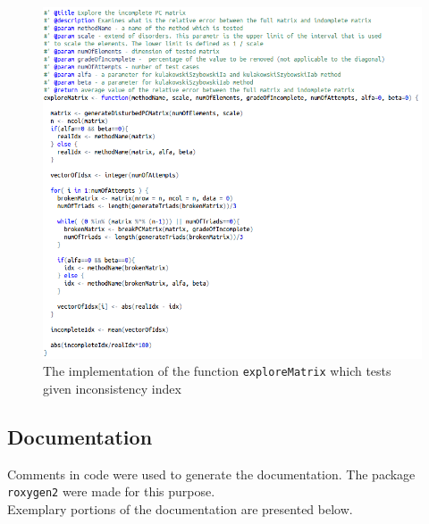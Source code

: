 \begin{figure}[h]
\centerline{\includegraphics[scale=0.58]{images/kod21.png}}
\caption{The implementation of the function \texttt{exploreMatrix} which tests given inconsistency index}
\end{figure}



\clearpage
\subsection{Documentation}
Comments in code were used to generate the documentation. The package \texttt{roxygen2} were made for this purpose. \\ Exemplary portions of the documentation are presented below.

